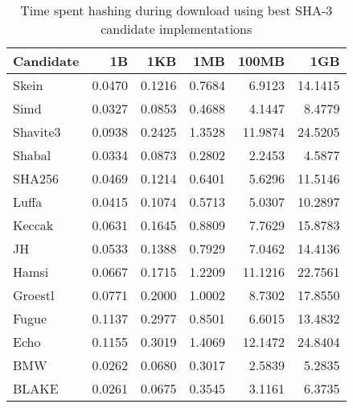 \begin{table} 
  \centering 
  \caption{Time spent hashing during download using best SHA-3 candidate implementations}
  \begin{tabular}{ | l | r | r | r | r | r | }
      \hline
      \textbf{Candidate} & \textbf{1B} & \textbf{1KB} & \textbf{1MB} & \textbf{100MB} & \textbf{1GB} \\ \hline
      Skein & 0.0470 & 0.1216 & 0.7684 & 6.9123 & 14.1415 \\ \hline
      Simd & 0.0327 & 0.0853 & 0.4688 & 4.1447 & 8.4779 \\ \hline
      Shavite3 & 0.0938 & 0.2425 & 1.3528 & 11.9874 & 24.5205 \\ \hline
      Shabal & 0.0334 & 0.0873 & 0.2802 & 2.2453 & 4.5877 \\ \hline
      SHA256 & 0.0469 & 0.1214 & 0.6401 & 5.6296 & 11.5146 \\ \hline
      Luffa & 0.0415 & 0.1074 & 0.5713 & 5.0307 & 10.2897 \\ \hline
      Keccak & 0.0631 & 0.1645 & 0.8809 & 7.7629 & 15.8783 \\ \hline
      JH & 0.0533 & 0.1388 & 0.7929 & 7.0462 & 14.4136 \\ \hline
      Hamsi & 0.0667 & 0.1715 & 1.2209 & 11.1216 & 22.7561 \\ \hline
      Groestl & 0.0771 & 0.2000 & 1.0002 & 8.7302 & 17.8550 \\ \hline
      Fugue & 0.1137 & 0.2977 & 0.8501 & 6.6015 & 13.4832 \\ \hline
      Echo & 0.1155 & 0.3019 & 1.4069 & 12.1472 & 24.8404 \\ \hline
      BMW & 0.0262 & 0.0680 & 0.3017 & 2.5839 & 5.2835 \\ \hline
      BLAKE & 0.0261 & 0.0675 & 0.3545 & 3.1161 & 6.3735 \\ \hline
  \end{tabular} 
  \label{tbl:tahoe:optimized_g}
\end{table}
